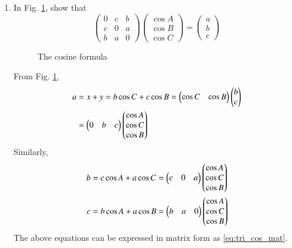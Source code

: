\begin{enumerate}[label=\thesection.\arabic*.,ref=\thesection.\theenumi]
%
\item
In Fig. \ref{fig:tri_cosine_formula}, show that
%
\begin{equation}
\label{eq:tri_cos_mat}
\begin{pmatrix}
0 & c & b \\
c & 0 & a \\
b & a & 0
\end{pmatrix}
\begin{pmatrix}
\cos A \\
\cos B \\
\cos C
\end{pmatrix}
= 
\begin{pmatrix}
a\\
b\\
c
\end{pmatrix}
\end{equation}
%
%
\begin{figure}[!ht]
	\begin{center}
		
		\resizebox{\columnwidth}{!}{}
	\end{center}
	\caption{The cosine formula}
	\label{fig:tri_cosine_formula}	
\end{figure}
\solution From Fig. \ref{fig:tri_cosine_formula}, 
%
\begin{align}
	a &= x + y = b \cos C + c \cos B = \begin{pmatrix}  \cos C & \cos B \end{pmatrix} \begin{pmatrix} b \\ c \end{pmatrix}
	\\
&=\begin{pmatrix}0 & b & c \end{pmatrix} \begin{pmatrix} \cos A \\ \cos C \\ \cos B \end{pmatrix} 
\end{align}
%
Similarly,
%
\begin{align}
b &= c \cos A + a \cos C 
=\begin{pmatrix}c & 0 & a \end{pmatrix} \begin{pmatrix} \cos A \\ \cos C \\ \cos B \end{pmatrix} 
	\\
c &= b \cos A + a \cos B
=\begin{pmatrix}b & a & 0 \end{pmatrix} \begin{pmatrix} \cos A \\ \cos C \\ \cos B \end{pmatrix} 
\end{align}
%
The above equations can be expressed in matrix form as
\eqref{eq:tri_cos_mat}.


\end{enumerate}
